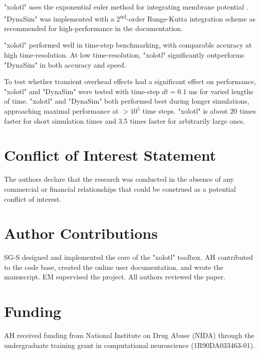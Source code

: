 \documentclass{frontiersSCNS} %
\begin{document}
"xolotl" uses the exponential euler method for integrating membrane potential \autocite{dayanTheoreticalNeuroscience2001}. "DynaSim" was implemented with a 2\textsuperscript{nd}-order Runge-Kutta integration scheme as recommended for high-performance in the documentation.

"xolotl" performed well in time-step benchmarking, with comparable accuracy at high time-resolution. At low time-resolution, "xolotl" significantly outperforms "DynaSim" in both accuracy and speed.

To test whether transient overhead effects had a significant effect on performance, "xolotl" and "DynaSim" were tested with time-step $dt = 0.1$ ms for varied lengths of time. "xolotl" and "DynaSim" both performed best during longer simulations, approaching maximal performance at $>10^5$ time steps. "xolotl" is about 20 times faster for short simulation times and 3.5 times faster for arbitrarily large ones.

\section*{Conflict of Interest Statement}

The authors declare that the research was conducted in the absence of any commercial or financial relationships that could be construed as a potential conflict of interest.

\section*{Author Contributions}

SG-S designed and implemented the core of the "xolotl" toolbox. AH contributed to the code base, created the online user documentation, and wrote the manuscript. EM supervised the project. All authors reviewed the paper.

\section*{Funding}

AH received funding from National Institute on Drug Abuse (NIDA) through the undergraduate training grant in computational neuroscience (1R90DA033463-01).
\end{document}
